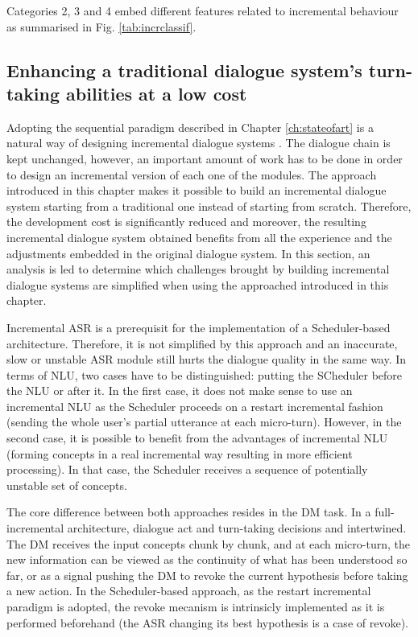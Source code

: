 		Categories 2, 3 and 4 embed different features related to incremental behaviour as summarised in Fig. \ref{tab:incrclassif}.

	\subsection{Enhancing a traditional dialogue system's turn-taking abilities at a low cost}
    
             Adopting the sequential paradigm described in Chapter \ref{ch:stateofart} is a natural way of designing incremental dialogue systems \cite{Schlangen2011}. The dialogue chain is kept unchanged, however, an important amount of work has to be done in order to design an incremental version of each one of the modules. The approach introduced in this chapter makes it possible to build an incremental dialogue system starting from a traditional one instead of starting from scratch. Therefore, the development cost is significantly reduced and moreover, the resulting incremental dialogue system obtained benefits from all the experience and the adjustments embedded in the original dialogue system. In this section, an analysis is led to determine which challenges brought by building incremental dialogue systems are simplified when using the approached introduced in this chapter.

             Incremental ASR is a prerequisit for the implementation of a Scheduler-based architecture. Therefore, it is not simplified by this approach and an inaccurate, slow or unstable ASR module still hurts the dialogue quality in the same way. In terms of NLU, two cases have to be distinguished: putting the SCheduler before the NLU or after it. In the first case, it does not make sense to use an incremental NLU as the Scheduler proceeds on a restart incremental fashion (sending the whole user's partial utterance at each micro-turn). However, in the second case, it is possible to benefit from the advantages of incremental NLU (forming concepts in a real incremental way resulting in more efficient processing). In that case, the Scheduler receives a sequence of potentially unstable set of concepts.

             The core difference between both approaches resides in the DM task. In a full-incremental architecture, dialogue act and turn-taking decisions and intertwined. The DM receives the input concepts chunk by chunk, and at each micro-turn, the new information can be viewed as the continuity of what has been understood so far, or as a signal pushing the DM to revoke the current hypothesis before taking a new action. In the Scheduler-based approach, as the restart incremental paradigm is adopted, the revoke mecanism is intrinsicly implemented as it is performed beforehand (the ASR changing its best hypothesis is a case of revoke).

